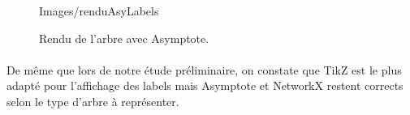 \begin{figure}[h] \centering %
 {Images/renduAsyLabels} %
\caption{Rendu de l'arbre avec Asymptote.}
\end{figure}

\paragraph{} De même que lors de notre étude préliminaire, on constate que TikZ est le plus adapté pour l'affichage des labels mais Asymptote et NetworkX restent corrects selon le type d'arbre à représenter.